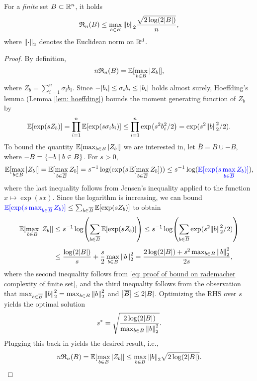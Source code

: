 \begin{lemma}
\label{lem: bound on rademacher complexity of finite set}
For a \emph{finite} set $B \subset \mathbb{R}^n$, it holds
\[
    \mathfrak{R}_n(B) \leq \max_{b \in B} \norm{b}_2 \frac{\sqrt{2 \log(2 \abs{B})}}{n},
\]
where $\norm{\cdot}_2$ denotes the Euclidean norm on $\mathbb{R}^d$.
\end{lemma}

\begin{proof}
By definition,
\[
    n \mathfrak{R}_n(B) = \operatorname{\mathbb{E}}[\max_{b \in B} \abs{Z_b}],
\]
where $Z_b = \sum_{i=1}^n \sigma_i b_i$. Since $-\abs{b_i} \leq \sigma_i b_i \leq \abs{b_i}$ holds almost surely, Hoeffding's lemma (Lemma \ref{lem: hoeffding}) bounds the moment generating function of $Z_b$ by
\begin{equation}
\label{eq: proof of bound on rademacher complexity of finite set}
    \operatorname{\mathbb{E}}[\exp(s Z_b)] = \prod_{i=1}^n \operatorname{\mathbb{E}}[\exp(s \sigma_i b_i)] \leq \prod_{i=1}^n \exp(s^2 b_i^2 / 2) = \operatorname{exp}(s^2 \norm{b}_2^2 / 2).
\end{equation}
To bound the quantity $\operatorname{\mathbb{E}}[\max_{b \in B} \abs{Z_b}]$ we are interested in, let $\overline{B} = B \cup -B$, where $-B = \set{-b \with b \in B}$. For $s>0$,
\[
    \operatorname{\mathbb{E}}[\max_{b \in B} \abs{Z_b}] = \operatorname{\mathbb{E}}[\max_{b \in \overline{B}} Z_b] = s^{-1} \operatorname{log}(\operatorname{exp}(s \operatorname{\mathbb{E}}[\max_{b \in \overline{B}} Z_b])) \leq s^{-1} \operatorname{log}({\color{blue} \operatorname{\mathbb{E}}[\operatorname{exp}(s \max_{b \in \overline{B}} Z_b)]}),
\]
where the last inequality follows from Jensen's inequality applied to the function $x \mapsto \exp(sx)$. Since the logarithm is increasing, we can bound ${\color{blue} \operatorname{\mathbb{E}}[\operatorname{exp}(s \max_{b \in \overline{B}} Z_b)]} \leq \sum_{b \in \overline{B}} \operatorname{\mathbb{E}}[\exp(s Z_b)]$ to obtain
\begin{align*}
    \operatorname{\mathbb{E}}[\max_{b \in B} \abs{Z_b}] &\leq s^{-1} \log(\sum_{b \in \overline{B}} \operatorname{\mathbb{E}}[\exp(s Z_b)]) \leq s^{-1} \log(\sum_{b \in \overline{B}} \operatorname{exp}(s^2 \norm{b}_2^2 / 2) ) \\[4pt]
    &\leq \frac{\log(2 \abs{B})}{s} + \frac{s}{2} \max_{b \in B} \norm{b}_2^2 = \frac{2 \log(2 \abs{B}) + s^2 \max_{b \in B} \norm{b}_2^2}{2s},
\end{align*}
where the second inequality follows from \eqref{eq: proof of bound on rademacher complexity of finite set}, and the third inequality follows from the observation that $\max_{b \in \overline{B}} \norm{b}_2^2 = \max_{b \in B} \norm{b}_2^2$ and $\abs{\overline{B}} \leq 2 \abs{B}$. Optimizing the RHS over $s$ yields the optimal solution
\[
    s^* = \sqrt{\frac{2 \log(2 \abs{B})}{\max_{b \in B} \norm{b}_2^2}}.
\]
Plugging this back in yields the desired result, i.e.,
\[
    n \mathfrak{R}_n(B) = \operatorname{\mathbb{E}}[\max_{b \in B} \abs{Z_b}] \leq \max_{b \in B} \norm{b}_2 \sqrt{2 \log(2 \abs{B})}. \qedhere
\]
\end{proof}

